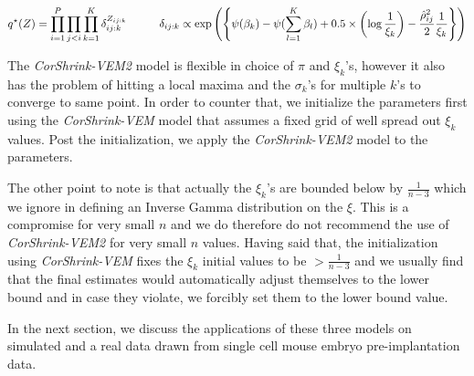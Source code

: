 \begin{equation}
 q^{\star}(Z) = \prod_{i=1}^{P} \prod_{j < i} \prod_{k=1}^{K} \delta_{ij:k}^{Z_{ij:k}}
\hspace{0.4 in} \delta_{ij:k} \propto \exp \left (   \left \{ \psi (\beta_{k}) - \psi (\sum_{l=1}^{K} \beta_{l} ) + 0.5 \times \left ( \log \frac{1}{\xi_{k}} \right ) -  \frac{\hat{\rho}^2_{ij}}{2} \frac{1}{\xi_{k}} \right \}  \right ) 
\end{equation}

The \textit{CorShrink-VEM2} model is flexible in choice of $\pi$ and $\xi_{k}$'s, however it also has the problem of hitting a local maxima and the $\sigma_{k}$'s for multiple $k$'s to converge to same point. In order to counter that, we initialize the parameters first using the  \textit{CorShrink-VEM} model that assumes a fixed grid of well spread out $\xi_{k}$ values. 
Post the initialization, we apply the \textit{CorShrink-VEM2} model to the parameters. 

The other point to note is that actually the $\xi_{k}$'s are bounded below by $\frac{1}{n-3}$ which we ignore in defining an Inverse Gamma distribution on the $\xi$. This is a compromise for very small $n$ and we do therefore do not recommend the use of \textit{CorShrink-VEM2}  for very small $n$ values. Having said that, the initialization using \textit{CorShrink-VEM} fixes the $\xi_{k}$ initial values to be $ > \frac{1}{n-3}$ and we usually find that the final estimates would automatically adjust themselves to the lower bound and in case they violate, we forcibly set them to the lower bound value. 

In the next section, we discuss the applications of these three models on simulated and a real data drawn from single cell mouse embryo pre-implantation data.




